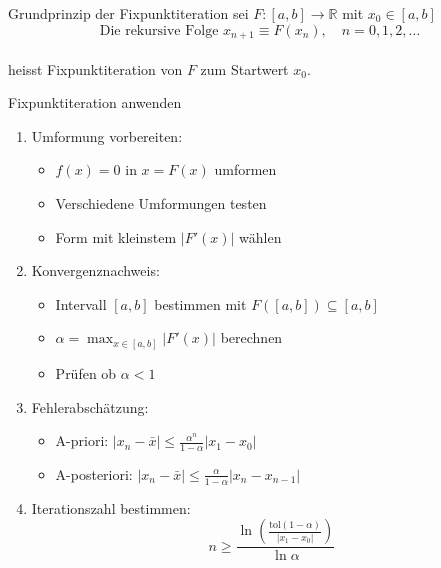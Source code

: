 \begin{concept}{Grundprinzip der Fixpunktiteration}
sei $F:[a,b] \rightarrow \mathbb{R}$ mit $x_0 \in [a,b]$ 
\vspace{-6mm}\\
$$\text{Die rekursive Folge }x_{n+1} \equiv F(x_n), \quad n=0,1,2,\ldots$$
\vspace{-4mm}\\
heisst Fixpunktiteration von $F$ zum Startwert $x_0$.
\end{concept}

\begin{KR}{Fixpunktiteration anwenden}
\begin{enumerate}
    \item Umformung vorbereiten:
    \begin{itemize}
        \item $f(x) = 0$ in $x = F(x)$ umformen
        \item Verschiedene Umformungen testen
        \item Form mit kleinstem $|F'(x)|$ wählen
    \end{itemize}
    
    \item Konvergenznachweis:
    \begin{itemize}
        \item Intervall $[a,b]$ bestimmen mit $F([a,b]) \subseteq [a,b]$
        \item $\alpha = \max_{x \in [a,b]} |F'(x)|$ berechnen
        \item Prüfen ob $\alpha < 1$
    \end{itemize}
    
    \item Fehlerabschätzung:
    \begin{itemize}
        \item A-priori: $|x_n-\bar{x}| \leq \frac{\alpha^n}{1-\alpha}|x_1-x_0|$
        \item A-posteriori: $|x_n-\bar{x}| \leq \frac{\alpha}{1-\alpha}|x_n-x_{n-1}|$
    \end{itemize}
    
    \item Iterationszahl bestimmen:
    $$n \geq \frac{\ln(\frac{\text{tol}(1-\alpha)}{|x_1-x_0|})}{\ln \alpha}$$
\end{enumerate}
\end{KR}

